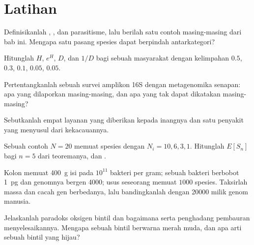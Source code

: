 \section{Latihan}

\begin{exercise}[$\star$]\label{exo:b3:microbiomes:1}
Definisikanlah , , dan parasitisme, lalu berilah satu
contoh masing-masing dari bab ini. Mengapa satu pasang spesies dapat berpindah
antarkategori?
\end{exercise}

\begin{exercise}[$\star$]\label{exo:b3:microbiomes:2}
Hitunglah $H$, $e^{H}$, $D$, dan $1/D$ bagi sebuah masyarakat dengan kelimpahan
$0.5$, $0.3$, $0.1$, $0.05$, $0.05$.
\end{exercise}

\begin{exercise}[$\star$]\label{exo:b3:microbiomes:3}
Pertentangkanlah sebuah survei amplikon 16S dengan metagenomika senapan: apa
yang dilaporkan masing-masing, dan apa yang tak dapat dikatakan masing-masing?
\end{exercise}

\begin{exercise}[$\star$]\label{exo:b3:microbiomes:4}
Sebutkanlah empat layanan yang diberikan  kepada inangnya dan
satu penyakit yang menyusul dari kekacauannya.
\end{exercise}

\begin{exercise}[$\star\star$]\label{exo:b3:microbiomes:5}
Sebuah contoh $N = 20$  memuat spesies dengan $N_{i} = 10, 6, 3, 1$.
Hitunglah $E[S_{n}]$ bagi $n = 5$ dari teoremanya, dan .
\end{exercise}

\begin{exercise}[$\star\star$]\label{exo:b3:microbiomes:6}
Kolon memuat \qty{400}{g} isi pada $10^{11}$ bakteri per
gram; sebuah bakteri berbobot \qty{1}{pg} dan genomnya bergen \num{4000};
usus seseorang memuat $1000$ spesies. Taksirlah massa
 dan cacah gen berbedanya, lalu bandingkanlah
dengan \num{20000} milik genom manusia.
\end{exercise}

\begin{exercise}[$\star\star$]\label{exo:b3:microbiomes:7}
Jelaskanlah paradoks oksigen bintil dan bagaimana  serta
penghadang pembauran menyelesaikannya. Mengapa sebuah bintil berwarna merah
muda, dan apa arti sebuah bintil yang hijau?
\end{exercise}


